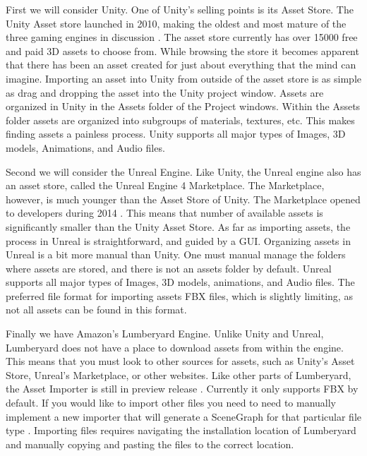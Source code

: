 \documentclass[10pt,journal,compsoc,onecolumn, draftclsnofoot]{IEEEtran}
\begin{document}
First we will consider Unity.
One of Unity's selling points is its Asset Store.
The Unity Asset store launched in 2010, making the oldest and most mature of the three gaming engines in discussion \cite{unity_store_age}.
The asset store currently has over 15000 free and paid 3D assets to choose from.
While browsing the store it becomes apparent that there has been an asset created for just about everything that the mind can imagine.
Importing an asset into Unity from outside of the asset store is as simple as drag and dropping the asset into the Unity project window.
Assets are organized in Unity in the Assets folder of the Project windows.
Within the Assets folder assets are organized into subgroups of materials, textures, etc.
This makes finding assets a painless process.
Unity supports all major types of Images, 3D models, Animations, and Audio files.

Second we will consider the Unreal Engine.
Like Unity, the Unreal engine also has an asset store, called the Unreal Engine 4 Marketplace.
The Marketplace, however, is much younger than the Asset Store of Unity.
The Marketplace opened to developers during 2014 \cite{unreal_marketplace_date}.
This means that number of available assets is significantly smaller than the Unity Asset Store.
As far as importing assets, the process in Unreal is straightforward, and guided by a GUI.
Organizing assets in Unreal is a bit more manual than Unity.
One must manual manage the folders where assets are stored, and there is not an assets folder by default.
Unreal supports all major types of Images, 3D models, animations, and Audio files.
The preferred file format for importing assets FBX files, which is slightly limiting, as not all assets can be found in this format.

Finally we have Amazon's Lumberyard Engine.
Unlike Unity and Unreal, Lumberyard does not have a place to download assets from within the engine.
This means that you must look to other sources for assets, such as Unity's Asset Store, Unreal's Marketplace, or other websites.
Like other parts of Lumberyard, the Asset Importer is still in preview release \cite{lumberyard_asset_import}.
Currently it only supports FBX by default.
If you would like to import other files you need to need to manually implement a new importer that will generate a SceneGraph for that particular file type \cite{lumberyard_asset_import}.
Importing files requires navigating the installation location of Lumberyard and manually copying and pasting the files to the correct location.
\end{document}
